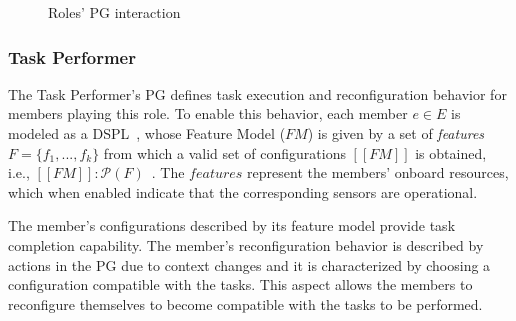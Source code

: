 \begin{figure}[!ht]
    \centering
    \scalebox{.75}{}
    \caption{Roles' PG interaction}
    \label{fig:diagram}
\end{figure}



\subsubsection{Task Performer}


The Task Performer's PG defines task execution and reconfiguration behavior for members playing this role. To enable this behavior, each member $e \in E$ is modeled as a DSPL~\citep{Hallsteinsen2008}, whose Feature Model ($FM$) is given by a set of \textit{features} $F=\{f_1, ...,f_k\}$ from which a valid set of configurations $[\![FM]\!]$ is obtained, i.e., $[\![FM]\!]: \mathcal{P}(F)$~\citep{Schobbens2006FeatureDA, Kang1990}. The $features$ represent the members’ onboard  resources, which when enabled indicate that the corresponding sensors are operational.

The member's configurations described by its feature model provide task completion capability. The member's reconfiguration behavior is described by actions in the PG due to context changes and it is characterized by choosing a configuration compatible with the tasks. This aspect allows the members to reconfigure themselves to become compatible with the tasks to be performed. 

